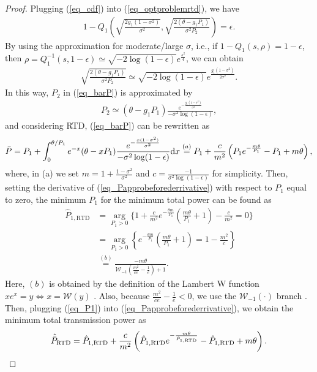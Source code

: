 \begin{proof}
Plugging (\ref{eq_cdf}) into (\ref{eq_optproblemrtd}), we have
\begin{align}
    1-Q_1\left(\sqrt{\frac{2g_1(1-\sigma^2)}{\sigma^2}},\sqrt{\frac{2(\theta-g_1P_1)}{\sigma^2 P_2}}\right) = \epsilon.
\end{align}
By using the approximation \cite[Eq. 17]{Azari2018TCultra} for moderate/large $\sigma$, i.e., if $1-Q_1(s,\rho) = 1-\epsilon$, then $\rho = Q_1^{-1}(s, 1-\epsilon) \simeq \sqrt{-2\log(1-\epsilon)}e^{\frac{s^2}{4}}$, we can obtain 
\begin{align}
    \sqrt{\frac{2(\theta-g_1P_1)}{\sigma^2 P_2}}\simeq \sqrt{-2\log(1-\epsilon)}e^{\frac{g_1(1-\sigma^2)}{2\sigma^2}}.
\end{align}
In this way, $P_2$ in (\ref{eq_barP}) is approximated by
\begin{align}
    P_2 \simeq (\theta - g_1P_1)\frac{e^{-\frac{g_1(1-\sigma^2)}{\sigma^2}}}{-\sigma^2\log(1-\epsilon)},
\end{align}
and considering RTD, (\ref{eq_barP}) can be rewritten as
\begin{align}\label{eq_Papprobeforederrivative}
    \Bar{P} = P_1 + \int_0^{\theta/P_1} e^{- x}(\theta - xP_1)\frac{e^{-\frac{x(1-\sigma^2)}{\sigma^2}}}{-\sigma^2\log(1-\epsilon)}\text{d}x \overset{(a)}{=} P_1 + \frac{c}{m^2}\left(P_1 e^{-\frac{m\theta}{P_1}}-P_1 + m\theta\right),
\end{align}
where, in (a) we set $m = 1 + \frac{1-\sigma^2}{\sigma^2}$ and $c = \frac{-1}{\sigma^2\log(1-\epsilon)}$ for simplicity. Then, setting the derivative of (\ref{eq_Papprobeforederrivative})  with respect to $P_1$ equal to zero, the minimum $P_1$ for the minimum total power can be found as
\begin{align}
  \label{eq_P1}
    \hat{P}_{1,\text{RTD}} & = \operatorname*{arg}_{P_1 > 0} \Bigg\{ 1 +  \frac{c}{m^2}e^{-\frac{\theta m}{P_1}}\left(\frac{m\theta}{P_1}+1\right) - \frac{c}{m^2} = 0\Bigg\}\nonumber\\
    & = \operatorname*{arg}_{P_1 > 0} \left\{e^{-\frac{\theta m}{P_1}}\left(\frac{m\theta}{P_1}+1\right) = 1-\frac{m^2}{c} \right\}\nonumber\\
    & \overset{(b)}= \frac{-m\theta}{\mathcal{W}_{-1}\left(\frac{m^2}{ce}-\frac{1}{e}\right)+1}.
\end{align}
Here, $(b)$ is obtained by the definition of the Lambert W function $xe^x = y \Leftrightarrow x = \mathcal{W}(y)$ \cite{corless1996lambertw}. Also, because $\frac{m^2}{ce}-\frac{1}{e}<0$, we use the $\mathcal{W}_{-1}(\cdot)$ branch \cite[Eq. 16]{veberic2010having}. Then, plugging (\ref{eq_P1}) into (\ref{eq_Papprobeforederrivative}), we obtain the  minimum total transmission power as
\begin{align}\label{eq_666666}
    \hat{\Bar{P}}_{\text{RTD}} =\hat{P}_{1,\text{RTD}} + \frac{c}{m^2}\left(\hat{P}_{1,\text{RTD}} e^{-\frac{m\theta}{\hat{P}_{1,\text{RTD}}}}-\hat{P}_{1,\text{RTD}} + m\theta\right).
\end{align}
\end{proof}


